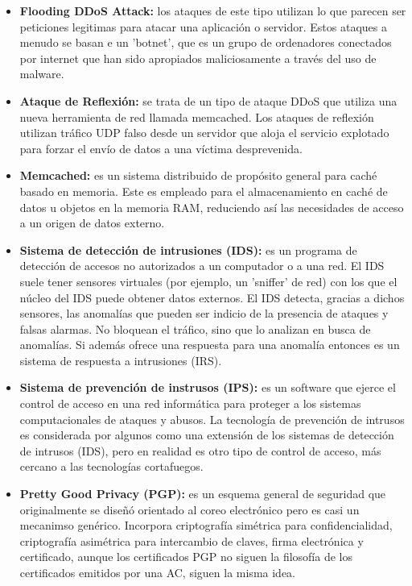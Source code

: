 \documentclass[a4paper,11pt]{article}
\begin{document}
\begin{itemize}
\item \textbf{Flooding DDoS Attack:} los ataques de este tipo utilizan lo que parecen ser peticiones legitimas para atacar una aplicación o servidor. Estos ataques a menudo se basan e un 'botnet', que es un grupo de ordenadores conectados por internet que han sido apropiados maliciosamente a través del uso de malware.

\item \textbf{Ataque de Reflexión:} se trata de un tipo de ataque DDoS que utiliza una nueva herramienta de red llamada memcached. Los ataques de reflexión utilizan tráfico UDP falso desde un servidor que aloja el servicio explotado para forzar el envío de datos a una víctima desprevenida.

\item \textbf{Memcached:} es un sistema distribuido de propósito general para caché basado en memoria. Este es empleado para el almacenamiento en caché de datos u objetos en la memoria RAM, reduciendo así las necesidades de acceso a un origen de datos externo.

\item \textbf{Sistema de detección de intrusiones (IDS):} es un programa de detección de accesos no autorizados a un computador o a una red. El IDS suele tener sensores virtuales (por ejemplo, un 'sniffer' de red) con los que el núcleo del IDS puede obtener datos externos. El IDS detecta, gracias a dichos sensores, las anomalías que pueden ser indicio de la presencia de ataques y falsas alarmas. No bloquean el tráfico, sino que lo analizan en busca de anomalías. Si además ofrece una respuesta para una anomalía entonces es un sistema de respuesta a intrusiones (IRS).

\item \textbf{Sistema de prevención de instrusos (IPS):} es un software que ejerce el control de acceso en una red informática para proteger a los sistemas computacionales de ataques y abusos. La tecnología de prevención de intrusos es considerada por algunos como una extensión de los sistemas de detección de intrusos (IDS), pero en realidad es otro tipo de control de acceso, más cercano a las tecnologías cortafuegos.

\item \textbf{Pretty Good Privacy (PGP):} es un esquema general de seguridad que originalmente se diseñó orientado al coreo electrónico pero es casi un mecanimso genérico. Incorpora criptografía simétrica para confidencialidad, criptografía asimétrica para intercambio de claves, firma electrónica y certificado, aunque los certificados PGP no siguen la filosofía de los certificados emitidos por una AC, siguen la misma idea.


\end{itemize}
\end{document}
